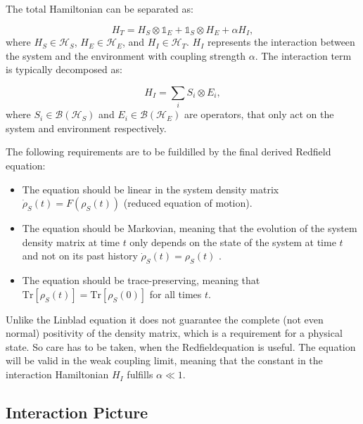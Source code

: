 The total Hamiltonian can be separated as:

\begin{equation}
    H_T = H_S \otimes \mathbb{1}_E + \mathbb{1}_S \otimes H_E + \alpha H_I,
    \label{eq:Total_Hamiltonian}
\end{equation}
where $H_S \in \mathcal{H}_S$, $H_E \in \mathcal{H}_E$, and $H_I \in \mathcal{H}_T$. $ H_I $ represents the interaction between the system and the environment with coupling strength $\alpha$.
The interaction term is typically decomposed as:

\begin{equation}
    H_I = \sum_i S_i \otimes E_i,
    \label{eq:Interaction_Hamiltonian}
\end{equation}
where $S_i \in \mathcal{B}(\mathcal{H}_S)$ and $E_i \in \mathcal{B}(\mathcal{H}_E)$ are operators, that only act on the system and environment respectively.

The following requirements are to be fuildilled by the final derived Redfield equation:

\begin{itemize}
    \item The equation should be linear in the system density matrix $ \dot{ \rho}_S(t) = F(\rho_S(t))$ (reduced equation of motion).
    \item The equation should be Markovian, meaning that the evolution of the system density matrix at time $t$ only depends on the state of the system at time $t$ and not on its past history $ \dot{ \rho}_S(t) = \rho_S(t)$ .
    \item The equation should be trace-preserving, meaning that $\mathrm{Tr}[\rho_S(t)] = \mathrm{Tr}[\rho_S(0)]$ for all times $t$.
\end{itemize}
Unlike the Linblad equation it does not guarantee the complete (not even normal) positivity of the density matrix, which is a requirement for a physical state.
So care has to be taken, when the Redfieldequation is useful.
The equation will be valid in the weak coupling limit, meaning that the constant in the interaction Hamiltonian $H_I$ fulfills  $\alpha \ll  1$.


\subsection{Interaction Picture}
\label{subsec:Interaction_Picture}

